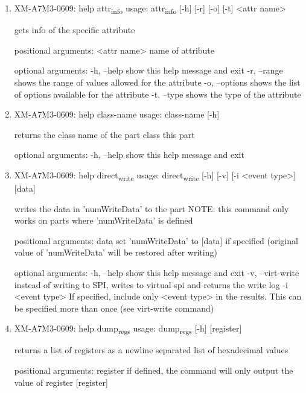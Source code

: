 \documentclass[11pt]{article}
\begin{document}
\begin{enumerate}
\item XM-A7M3-0609: help attr\textsubscript{info}
\label{sec:orgbe4507d}
usage: attr\textsubscript{info} [-h] [-r] [-o] [-t] <attr name>

gets info of the specific attribute

positional arguments:
  <attr name>    name of attribute

optional arguments:
  -h, --help     show this help message and exit
  -r, --range    shows the range of values allowed for the attribute
  -o, --options  shows the list of options available for the attribute
  -t, --type     shows the type of the attribute

\item XM-A7M3-0609: help class-name
\label{sec:org62a6558}
usage: class-name [-h]

returns the class name of the part class this part

optional arguments:
  -h, --help  show this help message and exit

\item XM-A7M3-0609: help direct\textsubscript{write}
\label{sec:org769da64}
usage: direct\textsubscript{write} [-h] [-v] [-i <event type>] [data]

writes the data in 'numWriteData' to the part NOTE: this command only works on
parts where 'numWriteData' is defined

positional arguments:
  data              set 'numWriteData' to [data] if specified (original value
                    of 'numWriteData' will be restored after writing)

optional arguments:
  -h, --help        show this help message and exit
  -v, --virt-write  instead of writing to SPI, writes to virtual spi and
                    returns the write log
  -i <event type>   If specified, include only <event type> in the results.
                    This can be specified more than once (see virt-write
                    command)

\item XM-A7M3-0609: help dump\textsubscript{regs}
\label{sec:orgf4dc735}
usage: dump\textsubscript{regs} [-h] [register]

returns a list of registers as a newline separated list of hexadecimal values

positional arguments:
  register    if defined, the command will only output the value of register
              [register]


\end{enumerate}
\end{document}
